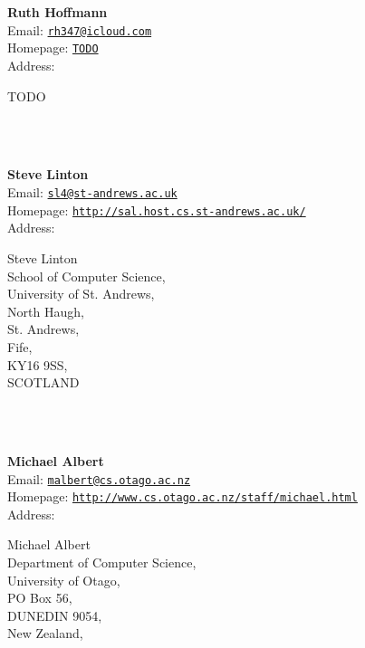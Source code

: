 \documentclass[a4paper,11pt]{report}
\begin{document}
\begin{titlepage}
\mbox{}\\
{\mbox{}\\
\small \noindent \textbf{ Ruth Hoffmann\\
    }  Email: \href{mailto://rh347@icloud.com} {\texttt{rh347@icloud.com}}\\
  Homepage: \href{TODO} {\texttt{TODO}}\\
  Address: \begin{minipage}[t]{8cm}\noindent
 TODO\\
 \end{minipage}
}\\
{\mbox{}\\
\small \noindent \textbf{ Steve Linton\\
    }  Email: \href{mailto://sl4@st-andrews.ac.uk} {\texttt{sl4@st-andrews.ac.uk}}\\
  Homepage: \href{http://sal.host.cs.st-andrews.ac.uk/} {\texttt{http://sal.host.cs.st-andrews.ac.uk/}}\\
  Address: \begin{minipage}[t]{8cm}\noindent
 Steve Linton\\
 School of Computer Science,\\
 University of St. Andrews,\\
 North Haugh,\\
 St. Andrews,\\
 Fife,\\
 KY16 9SS,\\
 SCOTLAND\\
 \end{minipage}
}\\
{\mbox{}\\
\small \noindent \textbf{ Michael Albert\\
    }  Email: \href{mailto://malbert@cs.otago.ac.nz} {\texttt{malbert@cs.otago.ac.nz}}\\
  Homepage: \href{http://www.cs.otago.ac.nz/staff/michael.html} {\texttt{http://www.cs.otago.ac.nz/staff/michael.html}}\\
  Address: \begin{minipage}[t]{8cm}\noindent
 Michael Albert\\
 Department of Computer Science,\\
 University of Otago,\\
 PO Box 56,\\
 DUNEDIN 9054,\\
 New Zealand,\\
 \end{minipage}
}\\
\end{titlepage}
\end{document}

